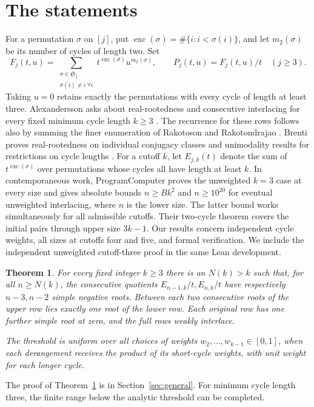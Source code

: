 \documentclass[11pt]{article}
\newtheorem{theorem}{Theorem}
\newcommand{\exc}{\operatorname{exc}}
\begin{document}
\section{The statements}
For a permutation \(\sigma\) on \([j]\), put \(\exc(\sigma)=\#\{i:i<\sigma(i)\}\), and let \(m_2(\sigma)\) be its number of cycles of length two. Set
\[
 F_j(t,u)=\sum_{\substack{\sigma\in\mathfrak S_j\\ \sigma(i)\ne i\ \forall i}}
       t^{\exc(\sigma)}u^{m_2(\sigma)},\qquad
 P_j(t,u)=F_j(t,u)/t\quad(j\ge3).
\]
Taking \(u=0\) retains exactly the permutations with every cycle of length at least three. Alexandersson asks about real-rootedness and consecutive interlacing for every fixed minimum cycle length \(k\ge3\) \cite{alex}. The recurrence for these rows follows also by summing the finer enumeration of Rakotoson and Rakotondrajao \cite[Theorem~30]{rr}. Brenti proves real-rootedness on individual conjugacy classes and unimodality results for restrictions on cycle lengths \cite[Theorems~3.2--3.4]{brenti}.
For a cutoff \(k\), let \(E_{j,k}(t)\) denote the sum of \(t^{\exc(\sigma)}\) over permutations whose cycles all have length at least \(k\).
In contemporaneous work, ProgramComputer \cite{programcomputer} proves the unweighted \(k=3\) case at every size and gives absolute bounds \(n\ge Bk^2\) and \(n\ge10^{20}\) for eventual unweighted interlacing, where \(n\) is the lower size. The latter bound works simultaneously for all admissible cutoffs. Their two-cycle theorem covers the initial pairs through upper size \(3k-1\). Our results concern independent cycle weights, all sizes at cutoffs four and five, and formal verification. We include the independent unweighted cutoff-three proof in the same Lean development.
\begin{theorem}\label{general}
For every fixed integer \(k\ge3\) there is an \(N(k)>k\) such that, for all \(n\ge N(k)\), the consecutive quotients \(E_{n-1,k}/t,E_{n,k}/t\) have respectively \(n-3,n-2\) simple negative roots. Between each two consecutive roots of the upper row lies exactly one root of the lower row. Each original row has one further simple root at zero, and the full rows weakly interlace.

The threshold is uniform over all choices of weights \(w_2,\ldots,w_{k-1}\in[0,1]\), when each derangement receives the product of its short-cycle weights, with unit weight for each longer cycle.
\end{theorem}
The proof of Theorem~\ref{general} is in Section~\ref{sec:general}. For minimum cycle length three, the finite range below the analytic threshold can be completed.
\end{document}

